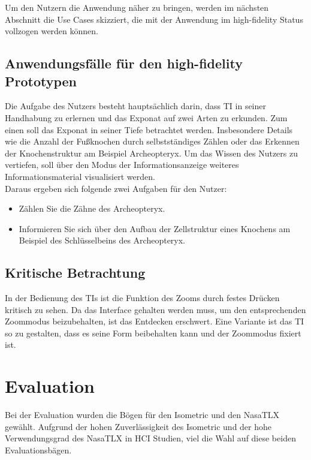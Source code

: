 \documentclass[runningheads,a4paper, 12pt]{llncs}
\begin{document}
Um den Nutzern die Anwendung näher zu bringen, werden im nächsten Abschnitt die Use Cases skizziert, die mit der Anwendung im high-fidelity Status vollzogen werden können.\\

\subsection{Anwendungsfälle für den high-fidelity Prototypen}
Die Aufgabe des Nutzers besteht hauptsächlich darin, dass TI in seiner Handhabung zu erlernen und das Exponat auf zwei Arten zu erkunden. Zum einen soll das Exponat in seiner Tiefe betrachtet werden. Insbesondere Details wie die Anzahl der Fußknochen durch selbstständiges Zählen oder das Erkennen der Knochenstruktur am Beispiel Archeopteryx. Um das Wissen des Nutzers zu vertiefen, soll über den Modus der Informationsanzeige weiteres Informationsmaterial visualisiert werden.\\ 

Daraus ergeben sich folgende zwei Aufgaben für den Nutzer:

\begin{itemize}
	\item Zählen Sie die Zähne des Archeopteryx.
	\item Informieren Sie sich über den Aufbau der Zellstruktur eines Knochens am Beispiel des Schlüsselbeins des Archeopteryx.
\end{itemize}

\subsection{Kritische Betrachtung}
In der Bedienung des TIs ist die Funktion des Zooms durch festes Drücken kritisch zu sehen. Da das Interface gehalten werden muss, um den entsprechenden Zoommodus beizubehalten, ist das Entdecken erschwert. Eine Variante ist das TI so zu gestalten, dass es seine Form beibehalten kann und der Zoommodus fixiert ist.\\

\section{Evaluation}
Bei der Evaluation wurden die Bögen für den Isometric und den NasaTLX gewählt. Aufgrund der hohen Zuverlässigkeit des Isometric und der hohe Verwendungsgrad des NasaTLX in HCI Studien, viel die Wahl auf diese beiden Evaluationsbägen.\\
\end{document}
